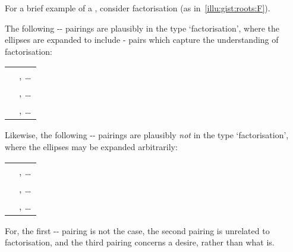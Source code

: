 \begin{note}
  For a brief example of a \torN{}, consider factorisation (as in~\autoref{illu:gist:roots:F}).

  The following -\val{}-\pool{} pairings are plausibly in the type `factorisation', where the ellipses are expanded to include - pairs which capture the \agents{} understanding of factorisation:
  \begin{center}
    \begin{tabular}{R{.45\textwidth} L{.45\textwidth}}
       & , \dots \\
       & , \dots \\
       & , \dots \\
    \end{tabular}
  \end{center}
  Likewise, the following -\val{}-\pool{} pairings are plausibly \emph{not} in the type `factorisation', where the ellipses may be expanded arbitrarily:

  \begin{center}
    \begin{tabular}{R{.45\textwidth} L{.45\textwidth}}
       & , \dots \\
       & , \dots \\
       & , \dots \\
    \end{tabular}
  \end{center}

  \noindent%
  For, the first -- pairing is not the case, the second pairing is unrelated to factorisation, and the third pairing concerns a desire, rather than what is.
\end{note}


